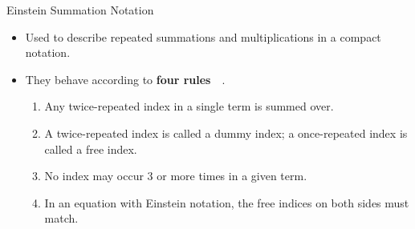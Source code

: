 \documentclass[aspectratio=169,xcolor=dvipsnames]{beamer}
\begin{document}
\begin{frame}{Einstein Summation Notation}
    \begin{itemize}
      \item Used to describe repeated summations and multiplications in a compact notation.
      \item They behave according to \textbf{four rules}~{\color{red}~\cite{Khan2023}}.
            \begin{enumerate}
            \item Any twice-repeated index in a single term is summed over.
            \item A twice-repeated index is called a dummy index; a once-repeated 
                  index is called a free index.
            \item No index may occur 3 or more times in a given term.
            \item In an equation with Einstein notation, the free indices on both sides must
                  match.
            \end{enumerate}
    \end{itemize}
\end{frame}
\end{document}
